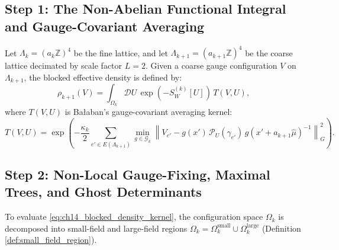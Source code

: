 \subsection{Step 1: The Non-Abelian Functional Integral and Gauge-Covariant Averaging}
\label{subsec:step1_functional_integral}

Let $\Lambda_k = (a_k \mathbb{Z})^4$ be the fine lattice, and let $\Lambda_{k+1} = (a_{k+1} \mathbb{Z})^4$ be the coarse lattice decimated by scale factor $L = 2$. Given a coarse gauge configuration $V$ on $\Lambda_{k+1}$, the blocked effective density is defined by:
\begin{equation}
\label{eq:ch14_blocked_density_kernel}
\rho_{k+1}(V) = \int_{\Omega_k} \mathcal{D}U \, \exp\left( -S_W^{(k)}[U] \right) \, T(V, U),
\end{equation}
where $T(V, U)$ is Ba\l aban's gauge-covariant averaging kernel:
\begin{equation}
\label{eq:ch14_averaging_kernel_explicit}
T(V, U) = \exp\left( -\frac{\kappa_k}{2} \sum_{e' \in E(\Lambda_{k+1})} \min_{g \in \mathcal{G}_k} \left\| V_{e'} - g(x') \, \mathcal{P}_U(\gamma_{e'}) \, g(x' + a_{k+1}\hat{\mu})^{-1} \right\|_G^2 \right).
\end{equation}

\subsection{Step 2: Non-Local Gauge-Fixing, Maximal Trees, and Ghost Determinants}
\label{subsec:step2_ghost_determinants}

To evaluate \eqref{eq:ch14_blocked_density_kernel}, the configuration space $\Omega_k$ is decomposed into small-field and large-field regions $\Omega_k = \Omega_k^{\mathrm{small}} \cup \Omega_k^{\mathrm{large}}$ (Definition \ref{def:small_field_region}).


